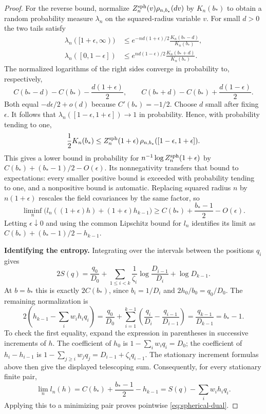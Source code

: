 \documentclass[11pt]{article}
\begin{document}
\begin{proof}
For the reverse bound, normalize
$Z_n^{\rm sph}(v)\rho_{n,b_*}(dv)$ by $K_n(b_*)$ to obtain a random
probability measure $\lambda_n$ on the squared-radius variable $v$.
For small $d>0$ the two tails satisfy
\[
 \begin{aligned}
 \lambda_n([1+\epsilon,\infty))
 &\le e^{-nd(1+\epsilon)/2}\frac{K_n(b_*-d)}{K_n(b_*)},\\
 \lambda_n([0,1-\epsilon])
 &\le e^{nd(1-\epsilon)/2}\frac{K_n(b_*+d)}{K_n(b_*)}.
 \end{aligned}
\]
The normalized logarithms of the right sides converge in probability to,
respectively,
\[
 C(b_*-d)-C(b_*)-\frac{d(1+\epsilon)}2,
 \qquad
 C(b_*+d)-C(b_*)+\frac{d(1-\epsilon)}2.
\]
Both equal $-d\epsilon/2+o(d)$ because $C'(b_*)=-1/2$.
Choose $d$ small after fixing $\epsilon$. It follows that
$\lambda_n([1-\epsilon,1+\epsilon])\to1$ in probability. Hence, with
probability tending to one,
\[
 \frac12K_n(b_*)\le
 Z_n^{\rm sph}(1+\epsilon)\,
 \rho_{n,b_*}([1-\epsilon,1+\epsilon]).
\]
This gives a lower bound in probability for
$n^{-1}\log Z_n^{\rm sph}(1+\epsilon)$ by
$C(b_*)+(b_*-1)/2-O(\epsilon)$.
Its nonnegativity transfers that bound to expectations: every smaller positive
bound is exceeded with probability tending to one, and a nonpositive bound
is automatic. Replacing squared radius $n$ by $n(1+\epsilon)$ rescales
the field covariances by the same factor, so
\[
 \liminf_n\bigl(l_n((1+\epsilon)h)+(1+\epsilon)h_{k-1}\bigr)
 \ge C(b_*)+\frac{b_*-1}{2}-O(\epsilon).
\]
Letting $\epsilon\downarrow0$ and using the common Lipschitz bound for $l_n$
identifies its limit as $C(b_*)+(b_*-1)/2-h_{k-1}$.

\textbf{Identifying the entropy.}
Integrating over the intervals between the positions $q_i$ gives
\[
 2S(q)=\frac{q_0}{D_0}
 +\sum_{1\le i<k}\frac1{\zeta_i}\log\frac{D_{i-1}}{D_i}
 +\log D_{k-1}.
\]
At $b=b_*$ this is exactly $2C(b_*)$, since
$b_i=1/D_i$ and $2h_0/b_0=q_0/D_0$.
The remaining normalization is
\[
 2\left(h_{k-1}-\sum_iw_ih_iq_i\right)
 =\frac{q_0}{D_0}
 +\sum_{i=1}^{k-1}\left(\frac{q_i}{D_i}-\frac{q_{i-1}}{D_{i-1}}\right)
 =\frac{q_{k-1}}{D_{k-1}}=b_*-1.
\]
To check the first equality, expand the expression in parentheses in
successive increments of $h$. The coefficient of $h_0$ is $1-\sum_iw_iq_i=D_0$; the coefficient of
$h_i-h_{i-1}$ is
$1-\sum_{j\ge i}w_jq_j=D_{i-1}+\zeta_iq_{i-1}$.
The stationary increment formulas above then give the displayed telescoping
sum. Consequently, for every stationary finite pair,
\[
 \lim_n l_n(h)=C(b_*)+\frac{b_*-1}{2}-h_{k-1}
 =S(q)-\sum_iw_ih_iq_i.
\]
Applying this to a minimizing pair proves pointwise
\eqref{eq:spherical-dual}.


\end{proof}
\end{document}
